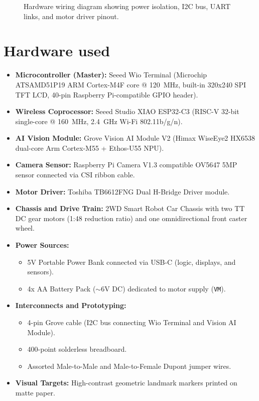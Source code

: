 \documentclass{article}
\begin{document}
\begin{figure}[htbp]
    \centering
    \caption{Hardware wiring diagram showing power isolation, I2C bus, UART links, and motor driver pinout.}
    \label{fig:circuit_diagram}
\end{figure}

\section{Hardware used}

\begin{itemize}
    \item \textbf{Microcontroller (Master):} Seeed Wio Terminal (Microchip ATSAMD51P19 ARM Cortex-M4F core @ 120~MHz, built-in 320x240 SPI TFT LCD, 40-pin Raspberry Pi-compatible GPIO header).
    \item \textbf{Wireless Coprocessor:} Seeed Studio XIAO ESP32-C3 (RISC-V 32-bit single-core @ 160~MHz, 2.4~GHz Wi-Fi 802.11b/g/n).
    \item \textbf{AI Vision Module:} Grove Vision AI Module V2 (Himax WiseEye2 HX6538 dual-core Arm Cortex-M55 + Ethos-U55 NPU).
    \item \textbf{Camera Sensor:} Raspberry Pi Camera V1.3 compatible OV5647 5MP sensor connected via CSI ribbon cable.
    \item \textbf{Motor Driver:} Toshiba TB6612FNG Dual H-Bridge Driver module.
    \item \textbf{Chassis and Drive Train:} 2WD Smart Robot Car Chassis with two TT DC gear motors (1:48 reduction ratio) and one omnidirectional front caster wheel.
    \item \textbf{Power Sources:}
    \begin{itemize}
        \item 5V Portable Power Bank connected via USB-C (logic, displays, and sensors).
        \item 4x AA Battery Pack ($\sim$6V DC) dedicated to motor supply (\texttt{VM}).
    \end{itemize}
    \item \textbf{Interconnects and Prototyping:}
    \begin{itemize}
        \item 4-pin Grove cable (I2C bus connecting Wio Terminal and Vision AI Module).
        \item 400-point solderless breadboard.
        \item Assorted Male-to-Male and Male-to-Female Dupont jumper wires.
    \end{itemize}
    \item \textbf{Visual Targets:} High-contrast geometric landmark markers printed on matte paper.
\end{itemize}
\end{document}
